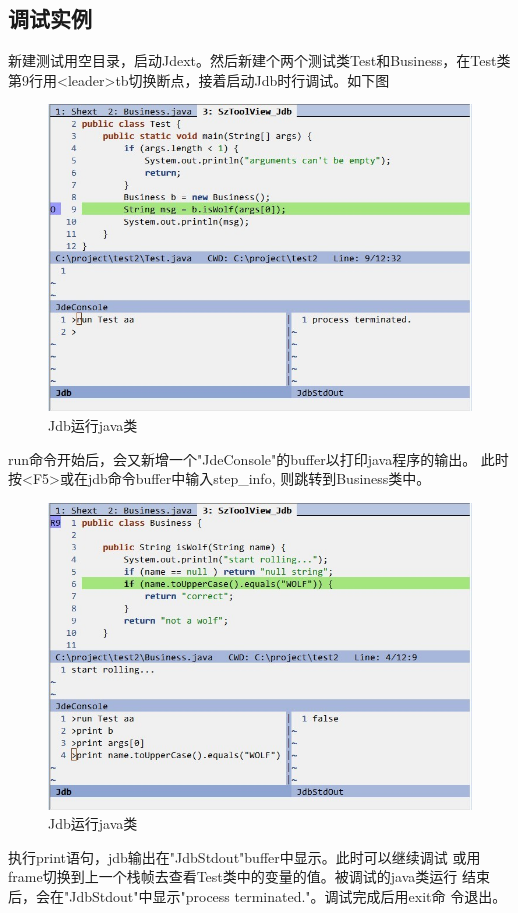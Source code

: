 \documentclass[oneside,openany]{book}
\begin{document}
  \subsection{调试实例}
  新建测试用空目录，启动Jdext。然后新建个两个测试类Test和Business，在Test类
第9行用<leader>tb切换断点，接着启动Jdb时行调试。如下图
  \FloatBarrier
  \begin{figure}[H]%
  \centering
  \includegraphics[scale=0.5]{jdb-run.jpg}
  \caption{Jdb运行java类}
  \end{figure}
  run命令开始后，会又新增一个"JdeConsole"的buffer以打印java程序的输出。
  此时按<F5>或在jdb命令buffer中输入step\_info, 则跳转到Business类中。
  \FloatBarrier
  \begin{figure}[H]%
  \centering
  \includegraphics[scale=0.5]{jdb-print2.jpg}
  \caption{Jdb运行java类}
  \end{figure}
  执行print语句，jdb输出在"JdbStdout"buffer中显示。此时可以继续调试
或用frame切换到上一个栈帧去查看Test类中的变量的值。被调试的java类运行
结束后，会在"JdbStdout"中显示"process terminated."。调试完成后用exit命
令退出。
\end{document}
